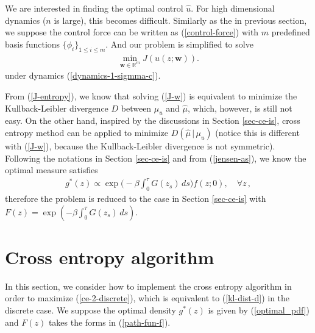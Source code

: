 \documentclass[final]{siamltex}
\begin{document}
We are interested in finding the optimal control $\hat{u}$. For high
dimensional dynamics ($n$ is large), this becomes difficult.  
Similarly as the in previous section, we suppose the control force can be written
as (\ref{control-force}) with $m$ predefined basis functions $\{\phi_i\}_{1\le
i \le m}$. And our problem is simplified to solve
\begin{align}
  \min_{\bm{w} \in \mathbb{R}^m} J(u(z;\bm{w})).
  \label{J-w}
\end{align}
under dynamics (\ref{dynamics-1-sigmma-c}).

From (\ref{J-entropy}), we know that solving (\ref{J-w})
is equivalent to minimize the Kullback-Leibler divergence $D$ between
$\mu_u$ and $\hat{\mu}$, which, however, is still not easy. On the other hand, inspired by 
the discussions in Section \ref{sec-ce-is}, cross entropy method can be
applied to minimize $D(\hat{\mu} \,|\, \mu_u)$ (notice this is different with
(\ref{J-w}), because the Kullback-Leibler divergence is not symmetric). Following
the notations in Section \ref{sec-ce-is} and from (\ref{jensen-as}), we know the optimal measure
satisfies
\begin{align}
  g^*(z) \propto \exp\Big(-\beta\int_0^\tau G(z_s) \,ds\Big) f(z ; 0),
  \quad \forall z\,,
\end{align}
therefore the problem is reduced to the case in Section \ref{sec-ce-is} with $F(z) = \exp(-\beta\int_0^\tau G(z_s) \,ds)$.
\section{Cross entropy algorithm}
\label{sec-ce-algo}
In this section, we consider how to implement the cross entropy algorithm in
order to maximize (\ref{ce-2-discrete}), which is equivalent to (\ref{kl-dist-d}) in the discrete case. 
We suppose the optimal density $g^*(z)$ is given by (\ref{optimal_pdf}) and
$F(z)$ takes the forms in (\ref{path-fun-f}).
\end{document}
